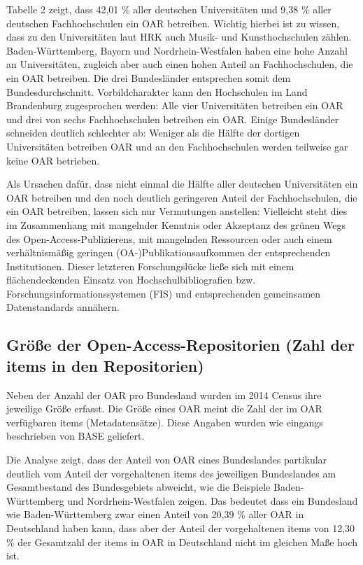 \documentclass[a4paper,
fontsize=11pt,
oneside,
numbers=noperiodatend,
parskip=half-,
bibliography=totoc,
final
]{scrartcl}
\begin{document}
Tabelle 2 zeigt, dass 42,01 \% aller deutschen Universitäten und 9,38 \%
aller deutschen Fachhochschulen ein OAR betreiben. Wichtig hierbei ist
zu wissen, dass zu den Universitäten laut HRK auch Musik- und
Kunsthochschulen zählen. Baden-Württemberg, Bayern und
Nordrhein-Westfalen haben eine hohe Anzahl an Universitäten, zugleich
aber auch einen hohen Anteil an Fachhochschulen, die ein OAR betreiben.
Die drei Bundesländer entsprechen somit dem Bundesdurchschnitt.
Vorbildcharakter kann den Hochschulen im Land Brandenburg zugesprochen
werden: Alle vier Universitäten betreiben ein OAR und drei von sechs
Fachhochschulen betreiben ein OAR. Einige Bundesländer schneiden
deutlich schlechter ab: Weniger als die Hälfte der dortigen
Universitäten betreiben OAR und an den Fachhochschulen werden teilweise
gar keine OAR betrieben.

Als Ursachen dafür, dass nicht einmal die Hälfte aller deutschen
Universitäten ein OAR betreiben und den noch deutlich geringeren Anteil
der Fachhochschulen, die ein OAR betreiben, lassen sich nur Vermutungen
anstellen: Vielleicht steht dies im Zusammenhang mit mangelnder Kenntnis
oder Akzeptanz des grünen Wegs des Open-Access-Publizierens, mit
mangelnden Ressourcen oder auch einem verhältnismäßig geringen
(OA-)Publikationsaufkommen der entsprechenden Institutionen. Dieser
letzteren Forschungslücke ließe sich mit einem flächendeckenden Einsatz
von Hochschulbibliografien bzw. Forschungsinformationssystemen (FIS) und
entsprechenden gemeinsamen Datenstandards annähern.

\subsection*{Größe der Open-Access-Repositorien (Zahl der items in den
Repositorien)}\label{gruxf6uxdfe-der-open-access-repositorien-zahl-der-items-in-den-repositorien}

Neben der Anzahl der OAR pro Bundesland wurden im 2014 Census ihre
jeweilige Größe erfasst. Die Größe eines OAR meint die Zahl der im OAR
verfügbaren items (Metadatensätze). Diese Angaben wurden wie eingangs
beschrieben von BASE geliefert.

Die Analyse zeigt, dass der Anteil von OAR eines Bundeslandes partikular
deutlich vom Anteil der vorgehaltenen items des jeweiligen Bundeslandes
am Gesamtbestand des Bundesgebiets abweicht, wie die Beispiele
Baden-Württemberg und Nordrhein-Westfalen zeigen. Das bedeutet dass ein
Bundesland wie Baden-Württemberg zwar einen Anteil von 20,39 \% aller
OAR in Deutschland haben kann, dass aber der Anteil der vorgehaltenen
items von 12,30 \% der Gesamtzahl der items in OAR in Deutschland nicht
im gleichen Maße hoch ist.
\end{document}
